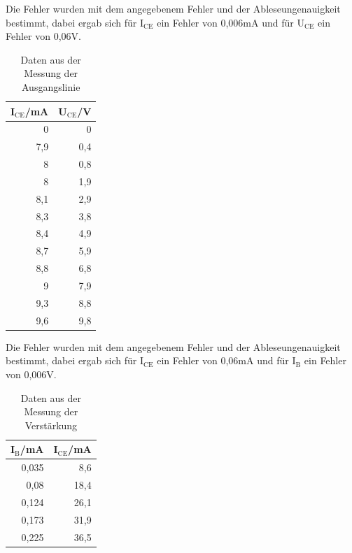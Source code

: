 \documentclass[12pt,a4paper]{article}
\begin{document}
Die Fehler wurden mit dem angegebenem Fehler und der Ableseungenauigkeit bestimmt, dabei ergab sich für I$_\text{CE}$ ein Fehler von 0,006mA und für U$_\text{CE}$ ein Fehler von 0,06V.

\begin{table}[H]
\caption{Daten aus der Messung der Ausgangslinie}
\begin{center}
\begin{tabular}{|r|r|}
\hline
\multicolumn{1}{|l|}{I$_\text{CE}$/mA} & \multicolumn{1}{l|}{U$_\text{CE}$/V} \\ \hline
0 & 0 \\ \hline
7,9 & 0,4 \\ \hline
8 & 0,8 \\ \hline
8 & 1,9 \\ \hline
8,1 & 2,9 \\ \hline
8,3 & 3,8 \\ \hline
8,4 & 4,9 \\ \hline
8,7 & 5,9 \\ \hline
8,8 & 6,8 \\ \hline
9 & 7,9 \\ \hline
9,3 & 8,8 \\ \hline
9,6 & 9,8 \\ \hline
\end{tabular}
\end{center}
\label{tab:a_1_a}
\end{table}


Die Fehler wurden mit dem angegebenem Fehler und der Ableseungenauigkeit bestimmt, dabei ergab sich für I$_\text{CE}$ ein Fehler von 0,06mA und für I$_\text{B}$ ein Fehler von 0,006V.


\begin{table}[H]
\caption{Daten aus der Messung der Verstärkung}
\begin{center}
\begin{tabular}{|r|r|}
\hline
\multicolumn{1}{|l|}{I$_\text{B}$/mA} & \multicolumn{1}{l|}{I$_\text{CE}$/mA} \\ \hline
0,035 & 8,6 \\ \hline
0,08 & 18,4 \\ \hline
0,124 & 26,1 \\ \hline
0,173 & 31,9 \\ \hline
0,225 & 36,5 \\ \hline
\end{tabular}
\end{center}
\label{tab:a_1_v}
\end{table}
\end{document}
